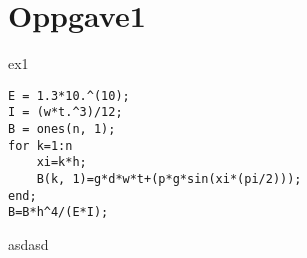 
%
%
\section{Oppgave1} %
\label{sec:oppgave_1}
ex1

\begin{lstlisting}
E = 1.3*10.^(10); 
I = (w*t.^3)/12; 
B = ones(n, 1);
for k=1:n
    xi=k*h; 
    B(k, 1)=g*d*w*t+(p*g*sin(xi*(pi/2)));
end;
B=B*h^4/(E*I);
  \end{lstlisting}
  asdasd